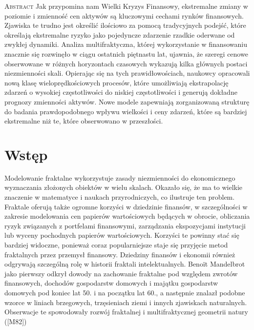 \documentclass[12pt]{article}
\theoremstyle{definition}
\begin{document}
\sloppy %

\textsc{Abstract} Jak przypomina nam Wielki Kryzys Finansowy, ekstremalne zmiany w poziomie i zmienność cen aktywów są kluczowymi cechami rynków finansowych. Zjawiska te trudno jest określić ilościowo za pomocą tradycyjnych podejść, które określają ekstremalne ryzyko jako pojedyncze zdarzenie rzadkie oderwane od zwykłej dynamiki. Analiza multifraktyczna, której wykorzystanie w finansowaniu znacznie się rozwinęło w ciągu ostatnich piętnastu lat, ujawnia, że szeregi cenowe obserwowane w różnych horyzontach czasowych wykazują kilka głównych postaci niezmienności skali. Opierając się na tych prawidłowościach, naukowcy opracowali nową klasę wieloprędkościowych procesów, które umożliwiają ekstrapolację zdarzeń o wysokiej częstotliwości do niskiej częstotliwości i generują dokładne prognozy zmienności aktywów. Nowe modele zapewniają zorganizowaną strukturę do badania prawdopodobnego wpływu wielkości i ceny zdarzeń, które są bardziej ekstremalne niż te, które obserwowano w przeszłości.

\section{Wstęp}

Modelowanie fraktalne wykorzystuje zasady niezmienności do ekonomicznego wyznaczania złożonych obiektów w wielu skalach. Okazało się, że ma to wielkie znaczenie w matematyce i naukach przyrodniczych, co ilustruje ten problem. Fraktale oferują także ogromne korzyści w dziedzinie finansów, w szczególności w zakresie modelowania cen papierów wartościowych będących w obrocie, obliczania ryzyk związanych z portfelami finansowymi, zarządzania ekspozycjami instytucji lub wyceny pochodnych papierów wartościowych. Korzyści te powinny stać się bardziej widoczne, ponieważ coraz popularniejsze staje się przyjęcie metod fraktalnych przez przemysł finansowy. Dziedziny finansów i ekonomii również odgrywają szczególną rolę w historii fraktali intelektualnych. Benoït Mandelbrot jako pierwszy odkrył dowody na zachowanie fraktalne pod względem zwrotów finansowych, dochodów gospodarstw domowych i majątku gospodarstw domowych pod koniec lat 50. i na początku lat 60., a następnie znalazł podobne wzorce w liniach brzegowych, trzęsieniach ziemi i innych zjawiskach naturalnych. Obserwacje te spowodowały rozwój fraktalnej i multifraktycznej geometrii natury ([M82])
\end{document}
